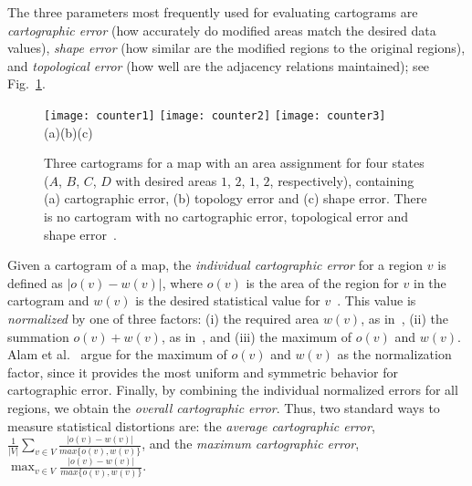 \documentclass{egpubl}
\begin{document}
The three parameters most frequently used for evaluating cartograms are {\em cartographic error} (how accurately do modified areas match the desired data values), {\em shape error} (how similar are  the modified regions to the original regions), and {\em topological error} (how well are the adjacency relations maintained); see Fig.~\ref{fig:counter}.


\begin{figure}[h]
\centering
\texttt{[image: counter1]}
\hspace{0.02cm}
\texttt{[image: counter2]}
\hspace{0.02cm}
\texttt{[image: counter3]}\\
(a)\hspace{0.14\textwidth}(b)\hspace{0.14\textwidth}(c)
\caption{ Three cartograms for a map with an area assignment for four states
 ($A$, $B$, $C$, $D$ with desired areas $1$, $2$, $1$, $2$, respectively),
 containing (a) cartographic error, (b) topology error and (c) shape error.
There is no cartogram with no cartographic error, topological error and shape error~\cite{AKV15}.}
\label{fig:counter}
\end{figure}




Given a cartogram of a map, the \textit{individual cartographic error} for a region $v$ is defined as
 $|o(v)-w(v)|$, where $o(v)$ is the area of the region for $v$ in the cartogram and $w(v)$ is the desired statistical value for $v$~\cite{KNPS03}. This value is {\em normalized} by one of three factors:  (i) the required area $w(v)$, as in~\cite{ks07,BSV12}, (ii) the summation $o(v)+w(v)$, as in~\cite{KNP04}, and
(iii) the maximum of $o(v)$ and $w(v)$. Alam et al.~\cite{AKV15} argue for the maximum of $o(v)$ and $w(v)$ as the normalization factor, since it provides the most uniform and symmetric behavior for cartographic error. Finally, by combining the individual normalized errors for all regions, we obtain the \textit{overall cartographic error}. Thus, two standard ways to measure statistical distortions are: the \textit{average cartographic error}, $\frac{1}{|V|}\displaystyle\sum_{v\in V}\frac{|o(v)-w(v)|}{max\{o(v),w(v)\}}$, and the \textit{maximum cartographic error}, $\displaystyle\max_{v\in V}\frac{|o(v)-w(v)|}{max\{o(v),w(v)\}}$.
\end{document}

